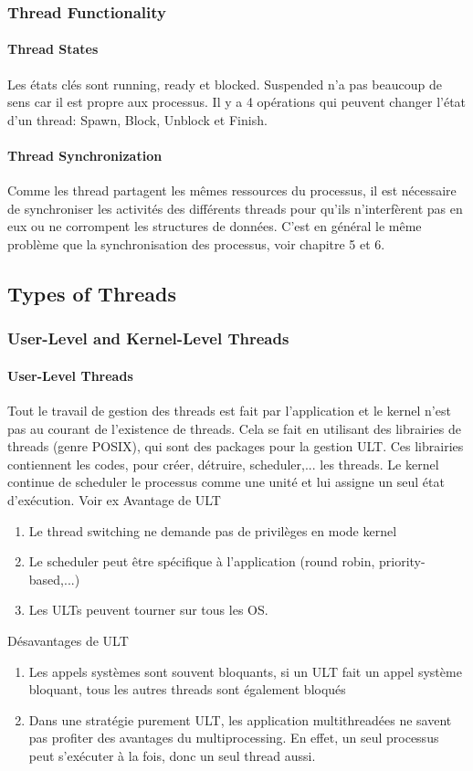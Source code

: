 \subsubsection{Thread Functionality}
\paragraph{Thread States}
Les états clés sont running, ready et blocked.
Suspended n'a pas beaucoup de sens car il est propre aux processus.
Il y a 4 opérations qui peuvent changer l'état d'un thread: Spawn, Block, Unblock et Finish.

\paragraph{Thread Synchronization}
Comme les thread partagent les mêmes ressources du processus, il est nécessaire de synchroniser les activités des différents threads pour qu'ils n'interfèrent pas en eux ou ne corrompent les structures de données.
C'est en général le même problème que la synchronisation des processus, voir chapitre 5 et 6.

\subsection{Types of Threads}
\subsubsection{User-Level and Kernel-Level Threads}
\paragraph{User-Level Threads}
Tout le travail de gestion des threads est fait par l'application et le kernel n'est pas au courant de l'existence de threads.
Cela se fait en utilisant des librairies de threads (genre POSIX), qui sont des packages pour la gestion ULT.
Ces librairies contiennent les codes, pour créer, détruire, scheduler,...
les threads.
Le kernel continue de scheduler le processus comme une unité et lui assigne un seul état d'exécution.
Voir ex \cite[p.~186]{stallings} Avantage de ULT
\begin{enumerate}
  \item Le thread switching ne demande pas de privilèges en mode kernel
  \item Le scheduler peut être spécifique à l'application (round robin, priority-based,...)
  \item Les ULTs peuvent tourner sur tous les OS.
\end{enumerate}
Désavantages de ULT
\begin{enumerate}
  \item Les appels systèmes sont souvent bloquants, si un ULT fait un appel système bloquant, tous les autres threads sont également bloqués
  \item Dans une stratégie purement ULT, les application multithreadées ne savent pas profiter des avantages du multiprocessing.
En effet, un seul processus peut s'exécuter à la fois, donc un seul thread aussi.
\end{enumerate}
